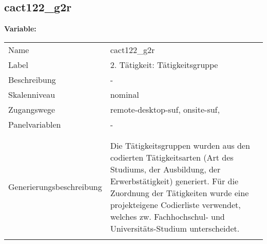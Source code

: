 	
	
	\subsection{cact122\_g2r}
	\label{subSection:cact122_g2r}

	\noindent\textbf{Variable:}\\
		\begin{tabular}{lL{11.3cm}}
			\label{tableVariable:cact122_g2r}
			Name & cact122\_g2r \\
			Label & 2. Tätigkeit: Tätigkeitsgruppe  \\
			Beschreibung & - \\
			Skalenniveau & nominal \\
			Zugangswege &
				remote-desktop-suf,
				onsite-suf,
 \\
			Panelvariablen & -
			 \\
			 \\
 \\
					Generierungsbeschreibung & Die Tätigkeitsgruppen wurden aus den codierten Tätigkeitsarten (Art des Studiums, der Ausbildung, der Erwerbstätigkeit) generiert. Für die Zuordnung der Tätigkeiten wurde eine projekteigene Codierliste verwendet, welches zw. Fachhochschul- und Universitäts-Studium unterscheidet.
				 \\	
			 \\
		\end{tabular}






